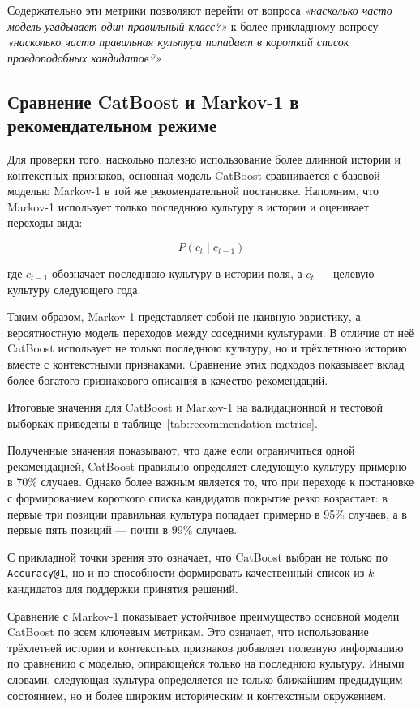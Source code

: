 Содержательно эти метрики позволяют перейти от вопроса \emph{«насколько часто модель угадывает один правильный класс?»} к более прикладному вопросу \emph{«насколько часто правильная культура попадает в короткий список правдоподобных кандидатов?»}

\subsection{Сравнение CatBoost и Markov-1 в рекомендательном режиме}

Для проверки того, насколько полезно использование более длинной истории и контекстных признаков, основная модель CatBoost сравнивается с базовой моделью Markov-1 в той же рекомендательной постановке. Напомним, что Markov-1 использует только последнюю культуру в истории и оценивает переходы вида:

\[
P(c_t \mid c_{t-1})
\]

где \(c_{t-1}\) обозначает последнюю культуру в истории поля, а \(c_t\) --- целевую культуру следующего года.

Таким образом, Markov-1 представляет собой не наивную эвристику, а вероятностную модель переходов между соседними культурами. В отличие от неё CatBoost использует не только последнюю культуру, но и трёхлетнюю историю вместе с контекстными признаками. Сравнение этих подходов показывает вклад более богатого признакового описания в качество рекомендаций.

Итоговые значения для CatBoost и Markov-1 на валидационной и тестовой выборках приведены в таблице~\ref{tab:recommendation-metrics}.



Полученные значения показывают, что даже если ограничиться одной рекомендацией, CatBoost правильно определяет следующую культуру примерно в 70\% случаев. Однако более важным является то, что при переходе к постановке с формированием короткого списка кандидатов покрытие резко возрастает: в первые три позиции правильная культура попадает примерно в 95\% случаев, а в первые пять позиций --- почти в 99\% случаев.

С прикладной точки зрения это означает, что CatBoost выбран не только по \texttt{Accuracy@1}, но и по способности
формировать качественный список из \(k\) кандидатов для поддержки принятия решений.

Сравнение с Markov-1 показывает устойчивое преимущество основной модели CatBoost по всем ключевым метрикам. Это
означает, что использование трёхлетней истории и контекстных признаков добавляет полезную информацию по сравнению с
моделью, опирающейся только на последнюю культуру. Иными словами, следующая культура определяется не только ближайшим
предыдущим состоянием, но и более широким историческим и контекстным окружением.

